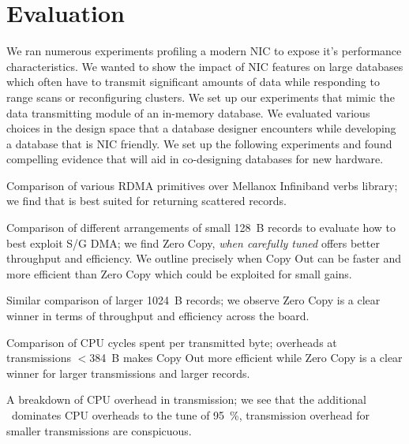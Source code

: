 \section{Evaluation}
We ran numerous experiments profiling a modern NIC to expose it's performance characteristics. 
We wanted to show the impact of NIC features on large databases which often have to 
transmit significant amounts of data while responding to range scans or reconfiguring clusters.
We set up our experiments that mimic the data transmitting module of an in-memory database. 
We evaluated various choices in the design space that a database designer encounters while developing 
a database that is NIC friendly. We set up the following experiments and found compelling 
evidence that will aid in co-designing databases for new hardware.
\begin{myitemize}
\item Comparison of various RDMA primitives over Mellanox Infiniband verbs library; we find that  is best suited for returning scattered records.
\item Comparison of different arrangements of small 128~B records to evaluate how to best exploit S/G DMA; we find Zero Copy, {\em when carefully tuned} offers better throughput and efficiency. We outline precisely when Copy Out can be faster 
and more efficient than Zero Copy which could be exploited for small gains.
\item Similar comparison of larger 1024~B records; we observe Zero Copy is a clear winner in terms of throughput and efficiency across the board.
\item Comparison of CPU cycles spent per transmitted byte; overheads at transmissions $<$384~B makes Copy Out more efficient while Zero Copy is a clear winner for larger transmissions and larger records.
\item A breakdown of CPU overhead in transmission; we see that the additional \memcpy ~dominates CPU overheads to the tune of 95~\%, transmission overhead for smaller transmissions are conspicuous.
\end{myitemize}



